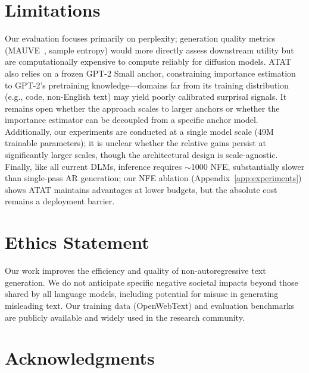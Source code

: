 \documentclass[11pt]{article}
\theoremstyle{remark}
\begin{document}
\section*{Limitations}
\label{sec:limitations}

Our evaluation focuses primarily on perplexity; generation quality metrics (MAUVE~\citep{mauve}, sample entropy) would more directly assess downstream utility but are computationally expensive to compute reliably for diffusion models. ATAT also relies on a frozen GPT-2 Small anchor, constraining importance estimation to GPT-2's pretraining knowledge---domains far from its training distribution (e.g., code, non-English text) may yield poorly calibrated surprisal signals. It remains open whether the approach scales to larger anchors or whether the importance estimator can be decoupled from a specific anchor model. Additionally, our experiments are conducted at a single model scale (49M trainable parameters); it is unclear whether the relative gains persist at significantly larger scales, though the architectural design is scale-agnostic. Finally, like all current DLMs, inference requires ${\sim}$1000 NFE, substantially slower than single-pass AR generation; our NFE ablation (Appendix~\ref{app:experiments}) shows ATAT maintains advantages at lower budgets, but the absolute cost remains a deployment barrier.

\section*{Ethics Statement}

Our work improves the efficiency and quality of non-autoregressive text generation. We do not anticipate specific negative societal impacts beyond those shared by all language models, including potential for misuse in generating misleading text. Our training data (OpenWebText) and evaluation benchmarks are publicly available and widely used in the research community.

\section*{Acknowledgments}
\end{document}
